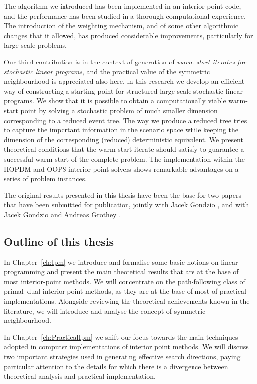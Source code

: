 The algorithm we introduced has been implemented in an interior
point code, and the performance has been studied in a thorough
computational experience. The introduction of the weighting mechanism,
and of some other algorithmic changes that it allowed,
has produced considerable improvements, particularly for large-scale
problems.

Our third contribution is in the context of generation of 
{\em warm-start iterates for stochastic linear programs}, 
and the practical value of the 
symmetric neighbourhood is appreciated also here.
In this research we develop an
efficient way of constructing a starting point for structured 
large-scale stochastic linear programs.
We show that it is possible to obtain a computationally viable
warm-start point by solving a stochastic problem of much smaller
dimension corresponding to a reduced event tree.
The way we produce a reduced tree tries to capture the 
important information in the scenario space while keeping 
the dimension of the corresponding (reduced) deterministic equivalent. 
We present theoretical conditions that the warm-start iterate
should satisfy to guarantee a successful warm-start of the complete 
problem. 
The implementation within the HOPDM and OOPS interior point solvers 
shows remarkable advantages on a series of problem instances.

The original results presented in this thesis have been the base for two
papers that have been submitted for publication, jointly with
Jacek Gondzio \cite{ColomboGondzio05}, and with Jacek Gondzio and 
Andreas Grothey \cite{ColomboGondzioGrothey06}.

%
%
\subsection{Outline of this thesis}

In Chapter~\ref{ch:Ipm} we introduce and formalise some basic
notions on linear programming and present the main theoretical results 
that are at the base of most interior-point methods. 
We will concentrate on the path-following class of
primal--dual interior point methods, as they are at the base of 
most of practical implementations.
Alongside reviewing the theoretical achievements known in the
literature, we will introduce and analyse the concept of 
symmetric neighbourhood.

In Chapter~\ref{ch:PracticalIpm} we shift our focus towards 
the main techniques adopted in computer implementations of
interior point methods.
We will discuss two important strategies used in generating
effective search directions, paying particular attention
to the details for which there is a divergence between theoretical
analysis and practical implementation.

